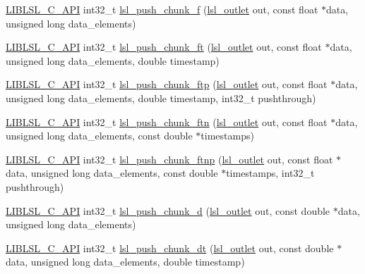 \begin{DoxyCompactItemize}
\item 
\hyperlink{lsl__cpp_8h_aafd0ef1813e8be84a1420c4f1df64615}{L\+I\+B\+L\+S\+L\+\_\+\+C\+\_\+\+A\+PI} int32\+\_\+t \hyperlink{namespacelsl_abaf77814f92eec3728670d14195b460b}{lsl\+\_\+push\+\_\+chunk\+\_\+f} (\hyperlink{namespacelsl_abcf512b0f66dacf86c10b165995fd50b}{lsl\+\_\+outlet} out, const float $\ast$data, unsigned long data\+\_\+elements)
\item 
\hyperlink{lsl__cpp_8h_aafd0ef1813e8be84a1420c4f1df64615}{L\+I\+B\+L\+S\+L\+\_\+\+C\+\_\+\+A\+PI} int32\+\_\+t \hyperlink{namespacelsl_a115ed5e462c162787436cd9800dbcb7e}{lsl\+\_\+push\+\_\+chunk\+\_\+ft} (\hyperlink{namespacelsl_abcf512b0f66dacf86c10b165995fd50b}{lsl\+\_\+outlet} out, const float $\ast$data, unsigned long data\+\_\+elements, double timestamp)
\item 
\hyperlink{lsl__cpp_8h_aafd0ef1813e8be84a1420c4f1df64615}{L\+I\+B\+L\+S\+L\+\_\+\+C\+\_\+\+A\+PI} int32\+\_\+t \hyperlink{namespacelsl_adf8f3e407c2b25a0e68aaf4e27df742d}{lsl\+\_\+push\+\_\+chunk\+\_\+ftp} (\hyperlink{namespacelsl_abcf512b0f66dacf86c10b165995fd50b}{lsl\+\_\+outlet} out, const float $\ast$data, unsigned long data\+\_\+elements, double timestamp, int32\+\_\+t pushthrough)
\item 
\hyperlink{lsl__cpp_8h_aafd0ef1813e8be84a1420c4f1df64615}{L\+I\+B\+L\+S\+L\+\_\+\+C\+\_\+\+A\+PI} int32\+\_\+t \hyperlink{namespacelsl_aee7313f1b6a8c88e7bdfc5f133986aaa}{lsl\+\_\+push\+\_\+chunk\+\_\+ftn} (\hyperlink{namespacelsl_abcf512b0f66dacf86c10b165995fd50b}{lsl\+\_\+outlet} out, const float $\ast$data, unsigned long data\+\_\+elements, const double $\ast$timestamps)
\item 
\hyperlink{lsl__cpp_8h_aafd0ef1813e8be84a1420c4f1df64615}{L\+I\+B\+L\+S\+L\+\_\+\+C\+\_\+\+A\+PI} int32\+\_\+t \hyperlink{namespacelsl_a5bb763124a2b2e74423b5c382a600b30}{lsl\+\_\+push\+\_\+chunk\+\_\+ftnp} (\hyperlink{namespacelsl_abcf512b0f66dacf86c10b165995fd50b}{lsl\+\_\+outlet} out, const float $\ast$data, unsigned long data\+\_\+elements, const double $\ast$timestamps, int32\+\_\+t pushthrough)
\item 
\hyperlink{lsl__cpp_8h_aafd0ef1813e8be84a1420c4f1df64615}{L\+I\+B\+L\+S\+L\+\_\+\+C\+\_\+\+A\+PI} int32\+\_\+t \hyperlink{namespacelsl_aba0e49750a9d56a0058b4287652043b1}{lsl\+\_\+push\+\_\+chunk\+\_\+d} (\hyperlink{namespacelsl_abcf512b0f66dacf86c10b165995fd50b}{lsl\+\_\+outlet} out, const double $\ast$data, unsigned long data\+\_\+elements)
\item 
\hyperlink{lsl__cpp_8h_aafd0ef1813e8be84a1420c4f1df64615}{L\+I\+B\+L\+S\+L\+\_\+\+C\+\_\+\+A\+PI} int32\+\_\+t \hyperlink{namespacelsl_ae0c9d5ce50a5e9c7cd612063b82c7e6b}{lsl\+\_\+push\+\_\+chunk\+\_\+dt} (\hyperlink{namespacelsl_abcf512b0f66dacf86c10b165995fd50b}{lsl\+\_\+outlet} out, const double $\ast$data, unsigned long data\+\_\+elements, double timestamp)

\end{DoxyCompactItemize}
